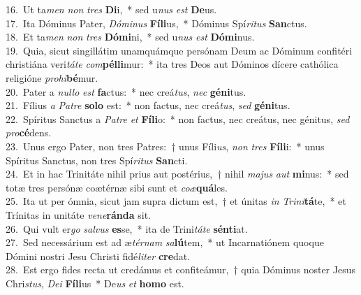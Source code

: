 {16.~}Ut ta\textit{men} \textit{non} \textit{tres} \textbf{Di}i,~* sed u\textit{nus} \textit{est} \textbf{De}us.\\
{17.~}Ita Dóminus Pater, \textit{Dó}\textit{mi}\textit{nus} \textbf{Fí}\textbf{li}us,~* Dóminus Spí\textit{ri}\textit{tus} \textbf{San}ctus.\\
{18.~}Et ta\textit{men} \textit{non} \textit{tres} \textbf{Dó}\textbf{mi}ni,~* sed u\textit{nus} \textit{est} \textbf{Dó}\textbf{mi}nus.\\
{19.~}Quia, sicut singillátim unamquámque persónam Deum ac Dóminum confitéri christiána veri\textit{tá}\textit{te} \textit{com}\textbf{pél}\textbf{li}mur:~* ita tres Deos aut Dóminos dícere cathólica religióne \textit{pro}\textit{hi}\textbf{bé}mur.\\
{20.~}Pater a \textit{nul}\textit{lo} \textit{est} \textbf{fa}ctus:~* nec creá\textit{tus}, \textit{nec} \textbf{gé}\textbf{ni}tus.\\
{21.~}Fílius \textit{a} \textit{Pa}\textit{tre} \textbf{so}\textbf{lo} est:~* non factus, nec creá\textit{tus}, \textit{sed} \textbf{gé}\textbf{ni}tus.\\
{22.~}Spíritus Sanctus a \textit{Pa}\textit{tre} \textit{et} \textbf{Fí}\textbf{li}o:~* non factus, nec creátus, nec génitus, \textit{sed} \textit{pro}\textbf{cé}dens.\\
{23.~}Unus ergo Pater, non tres Patres:~† unus Fíli\textit{us}, \textit{non} \textit{tres} \textbf{Fí}\textbf{li}i:~* unus Spíritus Sanctus, non tres Spí\textit{ri}\textit{tus} \textbf{San}cti.\\
{24.~}Et in hac Trinitáte nihil prius aut postérius,~† nihil \textit{ma}\textit{jus} \textit{aut} \textbf{mi}nus:~* sed totæ tres persónæ coætérnæ sibi sunt et \textit{co}\textit{æ}\textbf{quá}les.\\
{25.~}Ita ut per ómnia, sicut jam supra dictum est,~† et únitas \textit{in} \textit{Tri}\textit{ni}\textbf{tá}te,~* et Trínitas in unitáte \textit{ve}\textit{ne}\textbf{rán}\textbf{da} sit.\\
{26.~}Qui vult er\textit{go} \textit{sal}\textit{vus} \textbf{es}se,~* ita de Trini\textit{tá}\textit{te} \textbf{sén}\textbf{ti}at.\\
{27.~}Sed necessárium est ad æ\textit{tér}\textit{nam} \textit{sa}\textbf{lú}tem,~* ut Incarnatiónem quoque Dómini nostri Jesu Christi fidé\textit{li}\textit{ter} \textbf{cre}dat.\\
{28.~}Est ergo fides recta ut credámus et confiteámur,~† quia Dóminus noster Jesus Chri\textit{stus}, \textit{De}\textit{i} \textbf{Fí}\textbf{li}us~* De\textit{us} \textit{et} \textbf{ho}\textbf{mo} est.\\
